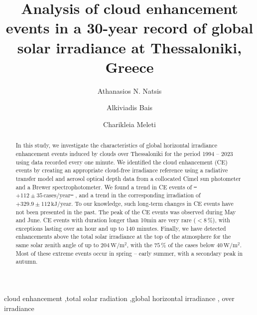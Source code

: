 \documentclass[preprint, 5p,
authoryear]{elsarticle} %
\providecommand{\DIFaddtex}[1]{{\protect\color{blue}\uwave{#1}}} %
\providecommand{\DIFdeltex}[1]{{\protect\color{red}\sout{#1}}}                      %
\providecommand{\DIFaddbegin}{} %
\providecommand{\DIFaddend}{} %
\providecommand{\DIFdelbegin}{} %
\providecommand{\DIFdelend}{} %
\providecommand{\DIFadd}[1]{\texorpdfstring{\DIFaddtex{#1}}{#1}} %
\providecommand{\DIFdel}[1]{\texorpdfstring{\DIFdeltex{#1}}{}} %
\newcommand{\DIFscaledelfig}{0.5}
\newlength{\DIFdelgraphicswidth} %
\newlength{\DIFdelgraphicsheight} %
\newcommand{\DIFaddincludegraphics}[2][]{{\color{blue}\fbox{\DIFOincludegraphics[#1]{#2}}}} %
\newcommand{\DIFdelincludegraphics}[2][]{%
\sbox{\DIFdelgraphicsbox}{\DIFOincludegraphics[#1]{#2}}%
\settoboxwidth{\DIFdelgraphicswidth}{\DIFdelgraphicsbox} %
\settoboxtotalheight{\DIFdelgraphicsheight}{\DIFdelgraphicsbox} %
\scalebox{\DIFscaledelfig}{%
\parbox[b]{\DIFdelgraphicswidth}{\usebox{\DIFdelgraphicsbox}\\[-\baselineskip] \rule{\DIFdelgraphicswidth}{0em}}\llap{\resizebox{\DIFdelgraphicswidth}{\DIFdelgraphicsheight}{%
\setlength{\unitlength}{\DIFdelgraphicswidth}%
\begin{picture}(1,1)%
\thicklines\linethickness{2pt} %
{\color[rgb]{1,0,0}\put(0,0){\framebox(1,1){}}}%
{\color[rgb]{1,0,0}\put(0,0){\line( 1,1){1}}}%
{\color[rgb]{1,0,0}\put(0,1){\line(1,-1){1}}}%
\end{picture}%
}\hspace*{3pt}}} %
} %
\DeclareRobustCommand{\DIFaddbegin}{\DIFOaddbegin \let\includegraphics\DIFaddincludegraphics} %
\DeclareRobustCommand{\DIFaddend}{\DIFOaddend \let\includegraphics\DIFOincludegraphics} %
\DeclareRobustCommand{\DIFdelbegin}{\DIFOdelbegin \let\includegraphics\DIFdelincludegraphics} %
\DeclareRobustCommand{\DIFdelend}{\DIFOaddend \let\includegraphics\DIFOincludegraphics} %
\begin{document}
\begin{frontmatter}

  \title{Analysis of cloud enhancement events in a 30-year record of
global solar irradiance at Thessaloniki, Greece}
    \author[LAP]{Athanasios N. Natsis%
  }
    \author[LAP]{Alkiviadis Bais%
  }
    \author[LAP]{Charikleia Meleti%
  }

  \begin{abstract}
  In this study, we investigate the characteristics of global horizontal
  irradiance enhancement events induced by clouds over Thessaloniki for
  the period 1994 -- 2023 using data recorded every one minute. We
  identified the cloud enhancement (CE) events by creating an
  appropriate cloud-free irradiance reference using a radiative transfer
  model and aerosol optical depth data from a collocated Cimel sun
  photometer and a Brewer spectrophotometer. We found a trend in CE
  events of \DIFdelbegin \DIFdel{%
\mbox{%
\(+112\pm 35\,\text{cases}/\text{year}\)
}%
}\DIFdelend \DIFaddbegin \DIFadd{%
\mbox{%
\(+113\pm 35\,\text{cases}/\text{year}\)
}%
}\DIFaddend , and a trend in the
  corresponding irradiation of
  \DIFdelbegin \DIFdel{\(+329.9\pm 112\,\text{kJ}/\text{year}\)}\DIFdelend \DIFaddbegin \DIFadd{\(+336.2\pm 114.1\,\text{kJ}/\text{year}\)}\DIFaddend . To our knowledge, such
  long-term changes in CE events have not been presented in the past.
  The peak of the CE events was observed during May and June. CE events
  with duration longer than 10\nobreakspace{}min are very rare
  (\(<8\,\%\)), with exceptions lasting over an hour and up to 140
  minutes. Finally, we have detected enhancements above the total solar
  irradiance at the top of the atmosphere for the same solar zenith
  angle of up to \(204\,\text{W}/\text{m}^{2}\), with the \(75\,\%\) of
  the cases below \(40\,\text{W}/\text{m}^{2}\). Most of these extreme
  events occur in spring -- early summer, with a secondary peak in
  autumn.
  \end{abstract}
    \begin{keyword}
    cloud enhancement \sep total solar radiation \sep global horizontal
irradiance \sep 
    over irradiance
  \end{keyword}

 \end{frontmatter}
\end{document}
